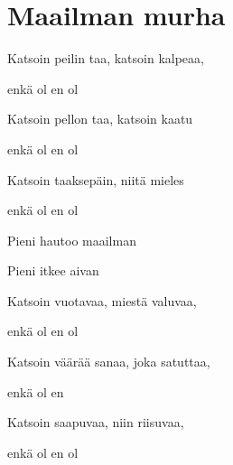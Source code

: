 \documentclass[12pt,a4paper]{article}
\begin{document}
\thispagestyle{empty}
\section*{Maailman murha}


\begin{SBVerse}
Katsoin  peilin taa, katsoin  kalpeaa,

enkä  ol en 
ol

Katsoin  pellon taa, katsoin  kaatu

enkä  ol en 
ol

Katsoin  taaksepäin, niitä  mieles

enkä  ol en 
ol
\end{SBVerse}

\begin{SBChorus}
Pieni   hautoo maailman

Pieni   itkee aivan 
\end{SBChorus}

\begin{SBVerse*}
    
\end{SBVerse*}

\begin{SBVerse}
Katsoin  vuotavaa, miestä  valuvaa,

enkä  ol en 
ol

Katsoin  väärää sanaa, joka  satuttaa,

enkä  ol en 

Katsoin  saapuvaa, niin  riisuvaa,

enkä  ol en 
ol
\end{SBVerse}
\end{document}
